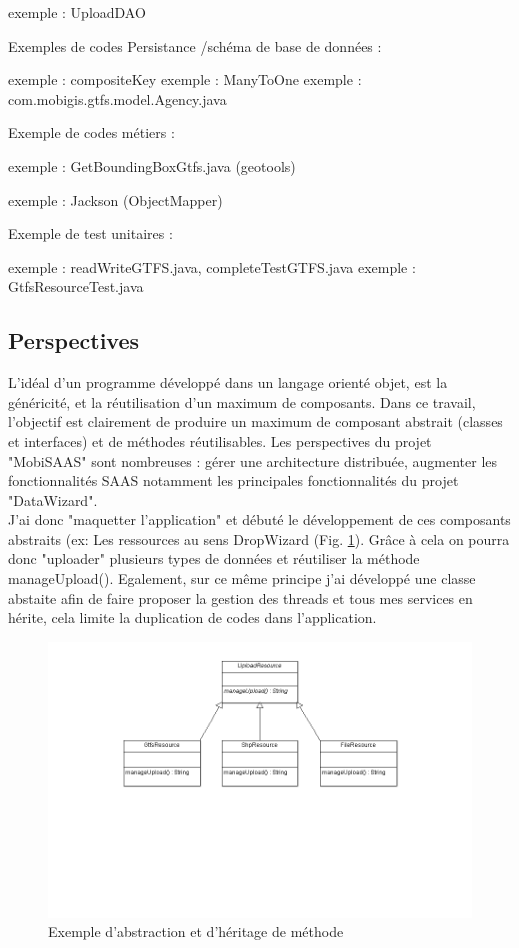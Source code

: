 \begin{itemize}
exemple : UploadDAO

Exemples de codes Persistance /schéma de base de données : 

exemple : compositeKey
exemple : ManyToOne
exemple : com.mobigis.gtfs.model.Agency.java


Exemple de codes métiers :

exemple : GetBoundingBoxGtfs.java (geotools)

exemple : Jackson (ObjectMapper)


Exemple de test unitaires :

exemple : readWriteGTFS.java, completeTestGTFS.java
exemple : GtfsResourceTest.java

\subsection{Perspectives}

L'idéal d'un programme développé dans un langage orienté objet, est la généricité, et la réutilisation d'un maximum de composants. Dans ce travail, l'objectif est clairement de produire un maximum de composant abstrait (classes et interfaces) et de méthodes réutilisables. Les perspectives du projet "MobiSAAS" sont nombreuses : gérer une architecture distribuée, augmenter les fonctionnalités SAAS notamment les principales fonctionnalités du projet "DataWizard".\\

J'ai donc "maquetter l'application" et débuté le développement de ces composants abstraits (ex: Les ressources au sens DropWizard (Fig. \ref{UML1}). Grâce à cela on pourra donc "uploader" plusieurs types de données et réutiliser la méthode manageUpload(). Egalement, sur ce même principe j'ai développé une classe abstaite afin de faire proposer la gestion des threads et tous mes services en hérite, cela limite la duplication de codes dans l'application.\\
\begin{figure}[!h]
\centering
\includegraphics[width=14cm]{images/Diagrammedeclasses_heritage_full.png}
\caption{\label{UML1}Exemple d'abstraction et d'héritage de méthode}
\end{figure} 


\end{itemize}
